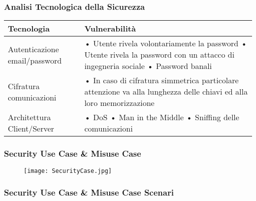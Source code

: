 \subsubsection{Analisi Tecnologica della Sicurezza}

\begin{tabular} {|P{4cm}|P{13cm}|}
  \hline
  Tecnologia                    & Vulnerabilità                                          \\
  \hline
  Autenticazione email/password & • Utente rivela volontariamente la password \linebreak
  • Utente rivela la password con un attacco di ingegneria sociale \linebreak
  • Password banali                                                                      \\
  \hline
  Cifratura comunicazioni       & • In caso di cifratura simmetrica particolare
  attenzione va alla lunghezza delle chiavi ed alla loro memorizzazione                  \\
  \hline
  Architettura Client/Server    & • DoS \linebreak
  • Man in the Middle \linebreak
  • Sniffing delle comunicazioni                                                         \\
  \hline
\end{tabular}

\newpage
\subsubsection{Security Use Case \& Misuse Case}
\par

\begin{figure}[h!]
  \begin{center}
    \texttt{[image: SecurityCase.jpg]}
  \end{center}
\end{figure}
\newpage


\subsubsection{Security Use Case \& Misuse Case Scenari}
\hfill

